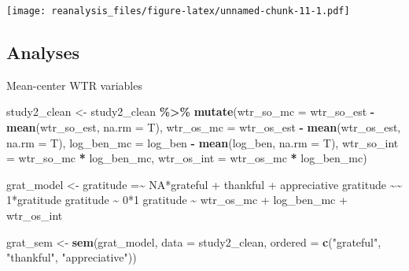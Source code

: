 \documentclass[
]{article}
\newenvironment{Shaded}{\begin{snugshade}}{\end{snugshade}}
\newcommand{\AttributeTok}[1]{\textcolor[rgb]{0.13,0.29,0.53}{#1}}
\newcommand{\FunctionTok}[1]{\textcolor[rgb]{0.13,0.29,0.53}{\textbf{#1}}}
\newcommand{\NormalTok}[1]{#1}
\newcommand{\OtherTok}[1]{\textcolor[rgb]{0.56,0.35,0.01}{#1}}
\newcommand{\SpecialCharTok}[1]{\textcolor[rgb]{0.81,0.36,0.00}{\textbf{#1}}}
\newcommand{\StringTok}[1]{\textcolor[rgb]{0.31,0.60,0.02}{#1}}
\begin{document}
\texttt{[image: reanalysis\_files/figure-latex/unnamed-chunk-11-1.pdf]}

\hypertarget{analyses-1}{%
\subsection{Analyses}\label{analyses-1}}

Mean-center WTR variables

\begin{Shaded}
\begin{Highlighting}[]
\NormalTok{study2\_clean }\OtherTok{\textless{}{-}}\NormalTok{ study2\_clean }\SpecialCharTok{\%\textgreater{}\%} 
  \FunctionTok{mutate}\NormalTok{(}\AttributeTok{wtr\_so\_mc =}\NormalTok{ wtr\_so\_est }\SpecialCharTok{{-}} \FunctionTok{mean}\NormalTok{(wtr\_so\_est, }\AttributeTok{na.rm =}\NormalTok{ T),}
         \AttributeTok{wtr\_os\_mc =}\NormalTok{ wtr\_os\_est }\SpecialCharTok{{-}} \FunctionTok{mean}\NormalTok{(wtr\_os\_est, }\AttributeTok{na.rm =}\NormalTok{ T),}
         \AttributeTok{log\_ben\_mc =}\NormalTok{ log\_ben }\SpecialCharTok{{-}} \FunctionTok{mean}\NormalTok{(log\_ben, }\AttributeTok{na.rm =}\NormalTok{ T),}
         \AttributeTok{wtr\_so\_int =}\NormalTok{ wtr\_so\_mc }\SpecialCharTok{*}\NormalTok{ log\_ben\_mc,}
         \AttributeTok{wtr\_os\_int =}\NormalTok{ wtr\_os\_mc }\SpecialCharTok{*}\NormalTok{ log\_ben\_mc)}
\end{Highlighting}
\end{Shaded}

\begin{Shaded}
\begin{Highlighting}[]
\NormalTok{grat\_model }\OtherTok{\textless{}{-}} \StringTok{\textquotesingle{}}
\StringTok{  gratitude =\textasciitilde{} NA*grateful + thankful + appreciative}
\StringTok{  gratitude \textasciitilde{}\textasciitilde{} 1*gratitude}
\StringTok{  gratitude \textasciitilde{} 0*1}
\StringTok{  }
\StringTok{  gratitude \textasciitilde{} wtr\_os\_mc + log\_ben\_mc + wtr\_os\_int}
\StringTok{\textquotesingle{}}

\NormalTok{grat\_sem }\OtherTok{\textless{}{-}} \FunctionTok{sem}\NormalTok{(grat\_model, }\AttributeTok{data =}\NormalTok{ study2\_clean, }\AttributeTok{ordered =} \FunctionTok{c}\NormalTok{(}\StringTok{"grateful"}\NormalTok{, }\StringTok{"thankful"}\NormalTok{, }\StringTok{"appreciative"}\NormalTok{))}
\end{Highlighting}
\end{Shaded}
\end{document}
